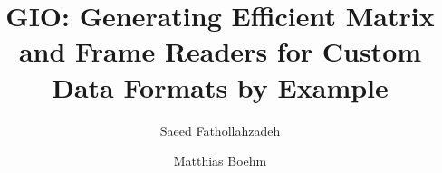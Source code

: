 \documentclass[sigconf,nonacm,screen]{acmart}
\begin{document}
    \title[GIO: Generating Efficient Matrix and Frame Readers for Custom Data Formats by Example]{GIO: Generating Efficient Matrix and Frame Readers for Custom Data Formats by Example}

    \author{Saeed Fathollahzadeh} 

    \author{Matthias Boehm} 

    \renewcommand{\shortauthors}{Saeed Fathollahzadeh \& Matthias Boehm}



    \maketitle
   




\end{document}
